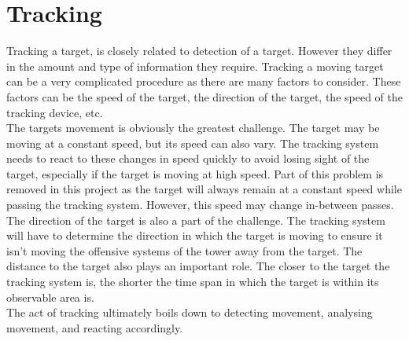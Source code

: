 \section{Tracking}\label{sec:tracking}\label{\automlabel}
Tracking a target, is closely related to detection of a target. However they differ in the amount and type of information they require. Tracking a moving target can be a very complicated procedure as there are many factors to consider. These factors can be the speed of the target, the direction of the target, the speed of the tracking device, etc.\\

The targets movement is obviously the greatest challenge. The target may be moving at a constant speed, but its speed can also vary. The tracking system needs to react to these changes in speed quickly to avoid losing sight of the target, especially if the target is moving at high speed. Part of this problem is removed in this project as the target will always remain at a constant speed while passing the tracking system. However, this speed may change in-between passes. The direction of the target is also a part of the challenge. The tracking system will have to determine the direction in which the target is moving to ensure it isn't moving the offensive systems of the tower away from the target. The distance to the target also plays an important role. The closer to the target the tracking system is, the shorter the time span in which the target is within its observable area is.\\

The act of tracking ultimately boils down to detecting movement, analysing movement, and reacting accordingly.\eal